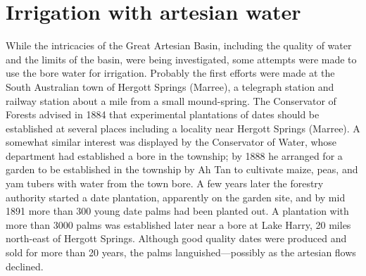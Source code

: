 \section*{Irrigation with artesian water}

While the intricacies of the Great Artesian Basin, including the
quality of water and the limits of the basin, were being investigated,
some attempts were made to use the bore water for irrigation.
Probably the first efforts were made at the South Australian town of
Hergott Springs (Marree), a telegraph station and railway station
about a mile from a small mound-spring.  The Conservator of Forests advised
in 1884 that experimental plantations of dates should be established
at several places including a locality near Hergott Springs
(Marree).  A somewhat similar interest was
displayed by the Conservator of Water, whose department had
established a bore in the township; by 1888 he arranged for a garden
to be established in the township by Ah Tan to cultivate maize, peas,
and yam tubers with water from the town bore.  A few years later the
forestry authority started a date plantation, apparently on the garden
site, and by mid 1891 more than 300 young date palms had been planted
out.  A plantation with more than
3000 palms was established later near a bore at Lake Harry, 20 miles
north-east of Hergott Springs.  Although good quality dates were produced and sold for more
than 20 years, the palms languished---possibly as the artesian flows
declined.

